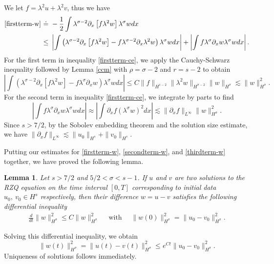 \documentclass[reqno]{amsart}
\theoremstyle{plain}
\newtheorem{lemma}{Lemma}[section]
\numberwithin{equation}{section}
\begin{document}
We let $f = \lambda^2 u +\lambda^2 v$, thus we have 
 \begin{align}    
 \eqref{firstterm-w} 
    \ \dot = & \ 
     -   \frac12 \int \lambda^{\sigma-2 } \partial_x  \left[ f \lambda^2   w   \right]     \lambda^\sigma w dx 
    \\
    \le & \ 
    \left|  \int  \left(  \lambda^{\sigma-2 } \partial_x  \left[ f \lambda^2   w   \right] - f \lambda^{\sigma-2 } \partial_x   \lambda^2    w      \right)  \lambda^\sigma w dx  \right| 
    +    \left|  \int  f \lambda^{\sigma } \partial_x       w   \lambda^\sigma w dx 
    \right| 
    . \label{firstterm-ce}
\end{align}
For the first term in inequality \eqref{firstterm-ce}, we apply the Cauchy-Schwarz inequality followed by Lemma \ref{ccm} with $\rho = \sigma-2$ and $r =s-2$ to obtain 
$$
 \left|  \int  \left(  \lambda^{\sigma-2 } \partial_x  \left[ f \lambda^2   w   \right] - f \lambda^{\sigma } \partial_x       w      \right)  \lambda^\sigma w dx  \right| 
 \le C\|f\|_{H^{s-2}}\|\lambda^2 w\|_{H^{\sigma -2}} \|w\|_{H^\sigma} \lesssim \| w\|_{H^\sigma }^2.
$$
For the second term in inequality \eqref{firstterm-ce}, we integrate by parts to find 
$$
  \left|  \int  f \lambda^{\sigma } \partial_x       w   \lambda^\sigma w dx 
    \right|  
    \approx
      \left|  \int  \partial_x   f (\lambda^{\sigma }         w )^2   dx 
    \right| 
    \lesssim \| \partial_x f \|_{L^\infty}  \| w\|_{H^\sigma }^2.
$$
Since $s>7/2$, by the Sobolev embedding theorem and the solution size estimate, we have 
$ \| \partial_x f \|_{L^\infty}  \lesssim \|u_0\|_{H^s } + \|v_0\|_{H^s }$. 

Putting our estimates for \eqref{firstterm-w}, \eqref{secondterm-w}, and \eqref{thirdterm-w} together, we have proved the following lemma. 
\begin{lemma}
    Let $s>7/2$ and $5/2<\sigma<s-1$. If $u$ and $v$ are two solutions to the RZQ equation on the time interval $[0, T]$ corresponding to initial data $u_0, \ v_0 \in H^s$ respectively, then their difference $w = u-v$ satisfies the following differential inequality 
    \begin{align}
       \frac{d}{dt} \| w\|_{H^\sigma}^2 \le C\| w\|_{H^\sigma}^2
     \quad \text{ with } \quad    \|w(0)\| _{H^\sigma}^2=     \|u_0-v_0\| _{H^\sigma}^2.
    \end{align}
\end{lemma}
Solving this differential inequality, we obtain 
$$
\| w(t) \|_{H^\sigma}^2 = \| u(t) -v(t) \|_{H^\sigma}^2 \le e^{Ct}  \| u _0-v_0 \|_{H^\sigma}^2. 
$$
Uniqueness of solutions follows immediately. 
\end{document}
